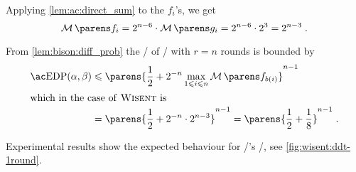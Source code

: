Applying \cref{lem:ac:direct_sum} to the $f_i$'s, we get
\begin{equation*}
    \absoluteindicator{f_i} = 2^{n-6} \cdot \absoluteindicator{g_i} = 2^{n-6} \cdot 2^3 = 2^{n-3}\;.
\end{equation*}

From \cref{lem:bison:diff_prob} the \EDP/ of \wisent/ with $r=n$ rounds is bounded by
\begin{align*}
    \mathrm{\EDP/}(\alpha, \beta)
    &\leqslant \parens{\frac{1}{2} + 2^{-n} \max_{1 \leqslant i \leqslant n} \absoluteindicator{f_{b(i)}}}^{n-1} \\
    \intertext{which in the case of \wisent/ is}
    &= \parens{\frac{1}{2} + 2^{-n} \cdot 2^{n-3}}^{n-1} = \parens{\frac{1}{2} + \frac{1}{8}}^{n-1}\;.
\end{align*}

Experimental results show the expected behaviour for \wisent/'s \DDT/, see \cref{fig:wisent:ddt-1round}.

